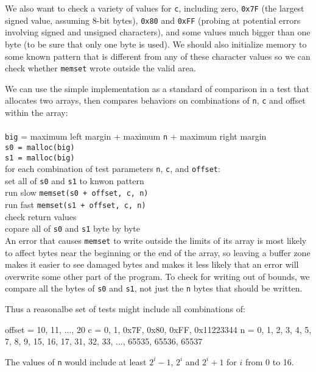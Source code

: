 We also want to check a variety of values for \texttt{c}, including zero,
\texttt{0x7F} (the largest signed value, assuming 8-bit bytes),
\texttt{0x80} and \texttt{0xFF} (probing at potential errors involving
signed and unsigned characters), and some values much bigger than one byte
(to be sure that only one byte is used). We should also initialize memory
to some known pattern that is different from any of these character values
so we can check whether \texttt{memset} wrote outside the valid area.

We can use the simple implementation as a standard of comparison in a test
that allocates two arrays, then compares behaviors on combinations of
\texttt{n}, \texttt{c} and offset within the array:
\\ \\
\indent \texttt{big} = maximum left margin + maximum \texttt{n} + maximum
right margin \\
\indent \texttt{s0 = malloc(big)} \\
\indent \texttt{s1 = malloc(big)} \\
\indent for each combination of test parameters \texttt{n}, \texttt{c}, and
\texttt{offset}: \\
\indent \indent set all of \texttt{s0} and \texttt{s1} to knwon pattern \\
\indent \indent run slow \texttt{memset(s0 + offset, c, n)} \\
\indent \indent run fast \texttt{memset(s1 + offset, c, n)} \\
\indent \indent check return values \\
\indent \indent copare all of \texttt{s0} and \texttt{s1} byte by byte \\
An error that causes \texttt{memset} to write outside the limits of its
array is most likely to affect bytes near the beginning or the end of the
array, so leaving a buffer zone makes it easier to see damaged bytes and
makes it less likely that an error will overwrite some other part of the
program. To check for writing out of bounds, we compare all the bytes of
\texttt{s0} and \texttt{s1}, not just the \texttt{n} bytes that should be
written.

Thus a reasonalbe set of tests might include all combinations of:
\begin{wellcode}
    offset = 10, 11, ..., 20
    c = 0, 1, 0x7F, 0x80, 0xFF, 0x11223344
    n = 0, 1, 2, 3, 4, 5, 7, 8, 9, 15, 16, 17,
        31, 32, 33, ..., 65535, 65536, 65537
\end{wellcode}
The values of \texttt{n} would include at least $2^i - 1$, $2^i$ and
$2^i + 1$ for $i$ from 0 to 16.


